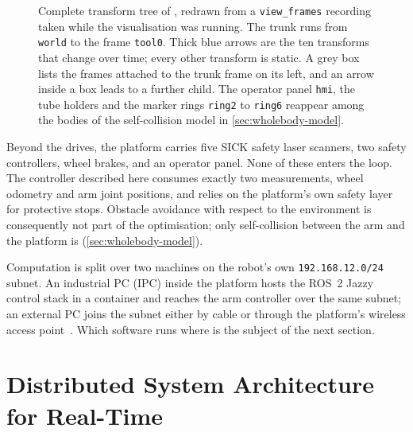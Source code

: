 \begin{figure}[htbp]
  \caption[Complete transform tree of \hero{}]{%
    Complete transform tree of \hero{}, redrawn from a
    \texttt{view\_frames} recording taken while the \ocs{} visualisation
    was running. The trunk runs from \texttt{world} to the \ee{} frame
    \texttt{tool0}. Thick blue arrows are the ten transforms that change
    over time; every other transform is static. A grey box lists the
    frames attached to the trunk frame on its left, and an arrow inside a
    box leads to a further child. The operator panel \texttt{hmi}, the
    tube holders and the marker rings \texttt{ring2} to \texttt{ring6}
    reappear among the bodies of the self-collision model in
    \cref{sec:wholebody-model}.}
  \label{fig:tf-tree}
\end{figure}

Beyond the drives, the platform carries five SICK safety laser scanners,
two safety controllers, wheel brakes, and an operator panel. None of
these enters the \mpc{} loop. The controller described here consumes
exactly two measurements, wheel odometry and arm joint positions, and
relies on the platform's own safety layer for protective stops. Obstacle
avoidance with respect to the environment is consequently not part of
the optimisation; only self-collision between the arm and the platform
is (\cref{sec:wholebody-model}).

Computation is split over two machines on the robot's own
\texttt{192.168.12.0/24} subnet. An industrial PC (IPC) inside the
platform hosts the ROS~2 Jazzy control stack in a container and reaches
the arm controller over the same subnet; an external PC joins
the subnet either by cable or through the platform's wireless access
point~\cite{ROS2,Macenski2022ROS2}. Which software runs where is the
subject of the next section.

\section{Distributed System Architecture for Real-Time \mpc{}}
\label{sec:distributed-arch}

